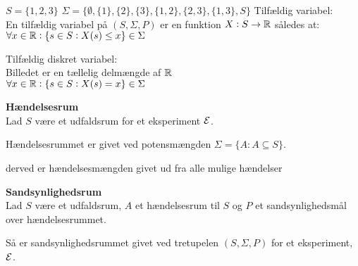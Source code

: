 
$S = \{1,2,3\}$
$\Sigma = \{\emptyset, \{ 1\}, \{ 2\}, \{ 3\},  \{ 1, 2\}, \{ 2,3 \}, \{ 1,3\}, S\}$
\pagebreak
Tilfældig variabel:\\
En tilfældig variabel på $(S,\Sigma, P)$ er en funktion $X:S\to \mathbb{R}$ således at:\\
$\forall x\in \mathbb{R} : \{s \in S: X(s)\leq x\} \in \Sigma$

Tilfældig diskret variabel:\\
Billedet er en tællelig delmængde af $\mathbb{R}$\\
$\forall x\in \mathbb{R} : \{s \in S: X(s) = x\} \in \Sigma$


\begin{minipage}\textwidth
\begin{defn}\textbf{Hændelsesrum}\\
    Lad $S$ være et udfaldsrum for et eksperiment $\mathcal{E}$.
    
    Hændelsesrummet er givet ved potensmængden
    $\Sigma = \{A:A\subseteq S\}$.
\end{defn}
\end{minipage}
derved er hændelsesmængden givet ud fra alle mulige hændelser

\begin{minipage}\textwidth
\begin{defn}\textbf{Sandsynlighedsrum}\\
    Lad $S$ være et udfaldsrum, $A$ et hændelsesrum til $S$ og $P$ et sandsynlighedsmål over hændelsesrummet. 
    
    Så er sandsynlighedsrummet givet ved tretupelen $(S, \Sigma, P)$ for et eksperiment, $\mathcal{E}$.
\end{defn}
\end{minipage}




